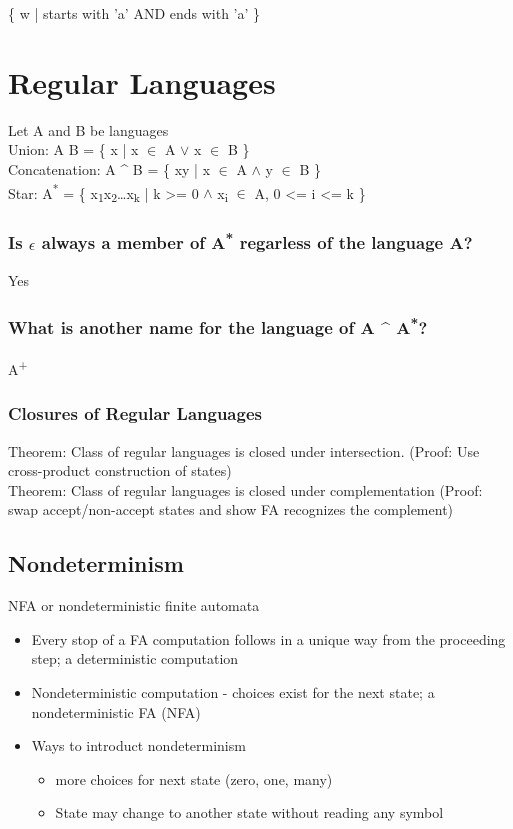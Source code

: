 \documentclass[11pt]{article}
\begin{document}
\{ w | starts with 'a' AND ends with 'a' \}\\
\section{Regular Languages}
\label{sec:org79abade}
Let A and B be languages\\
Union: A \union B = \{ x | x \(\in\) A \(\vee\) x \(\in\) B \}\\
Concatenation: A \^{} B = \{ xy | x \(\in\) A \(\wedge\) y \(\in\) B \}\\
Star: A\textsuperscript{*} = \{ x\textsubscript{1}x\textsubscript{2}\ldots{}x\textsubscript{k} | k >= 0 \(\wedge\) x\textsubscript{i} \(\in\) A, 0 <= i <= k \}\\
\subsubsection{Is \(\epsilon\) always a member of A\textsuperscript{*} regarless of the language A?}
\label{sec:org7ae2c9c}
Yes\\
\subsubsection{What is another name for the language of A \^{} A\textsuperscript{*}?}
\label{sec:org3a29740}
A\textsuperscript{+}\\
\subsubsection{Closures of Regular Languages}
\label{sec:orgf2eaeb2}
Theorem: Class of regular languages is closed under intersection. (Proof: Use cross-product construction of states)\\
Theorem: Class of regular languages is closed under complementation (Proof: swap accept/non-accept states and show FA recognizes the complement)\\
\subsection{Nondeterminism}
\label{sec:orgafb1fba}
NFA or nondeterministic finite automata\\
\begin{itemize}
\item Every stop of a FA computation follows in a unique way from the proceeding step; a deterministic computation\\
\item Nondeterministic computation - choices exist for the next state; a nondeterministic FA (NFA)\\
\item Ways to introduct nondeterminism\\
\begin{itemize}
\item more choices for next state (zero, one, many)\\
\item State may change to another state without reading any symbol\\
\end{itemize}
\end{itemize}
\end{document}
